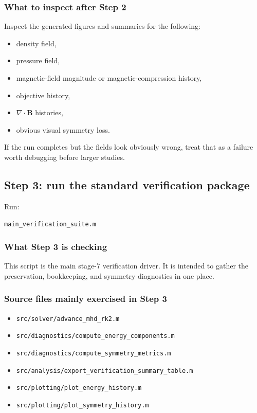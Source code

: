\documentclass[11pt]{article}
\begin{document}
\subsubsection{What to inspect after Step 2}
Inspect the generated figures and summaries for the following:
\begin{itemize}[leftmargin=1.8em]
    \item density field,
    \item pressure field,
    \item magnetic-field magnitude or magnetic-compression history,
    \item objective history,
    \item $\nabla\!\cdot\!\mathbf{B}$ histories,
    \item obvious visual symmetry loss.
\end{itemize}
If the run completes but the fields look obviously wrong, treat that as a failure worth debugging before larger studies.

\subsection{Step 3: run the standard verification package}
Run:
\begin{center}
\texttt{main\_verification\_suite.m}
\end{center}

\subsubsection{What Step 3 is checking}
This script is the main stage-7 verification driver. It is intended to gather the preservation, bookkeeping, and symmetry diagnostics in one place.

\subsubsection{Source files mainly exercised in Step 3}
\begin{itemize}[leftmargin=1.8em]
    \item \texttt{src/solver/advance\_mhd\_rk2.m}
    \item \texttt{src/diagnostics/compute\_energy\_components.m}
    \item \texttt{src/diagnostics/compute\_symmetry\_metrics.m}
    \item \texttt{src/analysis/export\_verification\_summary\_table.m}
    \item \texttt{src/plotting/plot\_energy\_history.m}
    \item \texttt{src/plotting/plot\_symmetry\_history.m}
\end{itemize}
\end{document}

